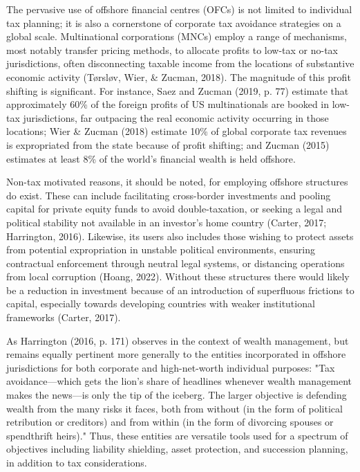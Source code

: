 The pervasive use of offshore financial centres (OFCs) is not limited to individual tax planning; it is also a cornerstone of corporate tax avoidance strategies on a global scale. Multinational corporations (MNCs) employ a range of mechanisms, most notably transfer pricing methods, to allocate profits to low-tax or no-tax jurisdictions, often disconnecting taxable income from the locations of substantive economic activity (Tørsløv, Wier, \& Zucman, 2018). The magnitude of this profit shifting is significant. For instance, Saez and Zucman (2019, p. 77) estimate that approximately 60\% of the foreign profits of US multinationals are booked in low-tax jurisdictions, far outpacing the real economic activity occurring in those locations; Wier \& Zucman (2018) estimate 10\% of global corporate tax revenues is expropriated from the state because of profit shifting; and Zucman (2015) estimates at least 8\% of the world's financial wealth is held offshore.

Non-tax motivated reasons, it should be noted, for employing offshore structures do exist. These can include facilitating cross-border investments and pooling capital for private equity funds to avoid double-taxation, or seeking a legal and political stability not available in an investor's home country (Carter, 2017; Harrington, 2016). Likewise, its users also includes those wishing to protect assets from potential expropriation in unstable political environments, ensuring contractual enforcement through neutral legal systems, or distancing operations from local corruption (Hoang, 2022). Without these structures there would likely be a reduction in investment because of an introduction of superfluous frictions to capital, especially towards developing countries with weaker institutional frameworks (Carter, 2017).

As Harrington (2016, p. 171) observes in the context of wealth management, but remains equally pertinent more generally to the entities incorporated in offshore jurisdictions for both corporate and high-net-worth individual purposes: "Tax avoidance—which gets the lion’s share of headlines whenever wealth management makes the news—is only the tip of the iceberg. The larger objective is defending wealth from the many risks it faces, both from without (in the form of political retribution or creditors) and from within (in the form of divorcing spouses or spendthrift heirs)." Thus, these entities are versatile tools used for a spectrum of objectives including liability shielding, asset protection, and succession planning, in addition to tax considerations.


